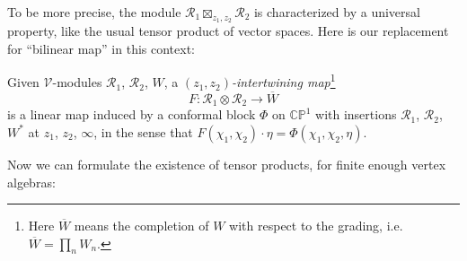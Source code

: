 \documentclass[12pt,letterpaper,reqno]{amsart}
\numberwithin{equation}{section}
\newcommand{\bbC}{\ensuremath{\mathbb C}}
\newcommand{\bbP}{\ensuremath{\mathbb P}}
\newcommand\vac{{|\Omega\rangle}}
\newcommand{\vertex}{\mathcal{V}}
\newcommand{\vrep}{\mathcal{R}}
\newcommand{\abs}[1]{\lvert#1\rvert}
\newcommand{\ti}[1]{\textit{#1}}
\DeclareRobustCommand{\fixme}[1]{\leavevmode{\color{orange}[#1]}}
\begin{document}
To be more precise,
the module $\vrep_1 \boxtimes_{z_1,z_2} \vrep_2$ is characterized by a universal property, like the usual tensor
product of vector spaces. Here is our replacement for ``bilinear
map'' in this context:
\begin{defn} Given $\vertex$-modules $\vrep_1$, $\vrep_2$, $W$, a \ti{$(z_1,z_2)$-intertwining map}\footnote{Here $\overline{W}$ means the completion of $W$ with respect to the grading, i.e. $\overline{W} = \prod_n W_n$.}
\begin{equation}
 F: \vrep_1 \otimes \vrep_2 \to \overline{W}
\end{equation}
is a linear map induced by a conformal block $\Phi$
on $\bbC \bbP^1$ with insertions $\vrep_1$, $\vrep_2$, $W^*$
at $z_1$, $z_2$, $\infty$,
in the sense that $F(\chi_1, \chi_2) \cdot \eta = \Phi(\chi_1, \chi_2, \eta)$.
\end{defn}



Now we can formulate the existence of tensor products, for
finite enough vertex algebras:
\end{document}
